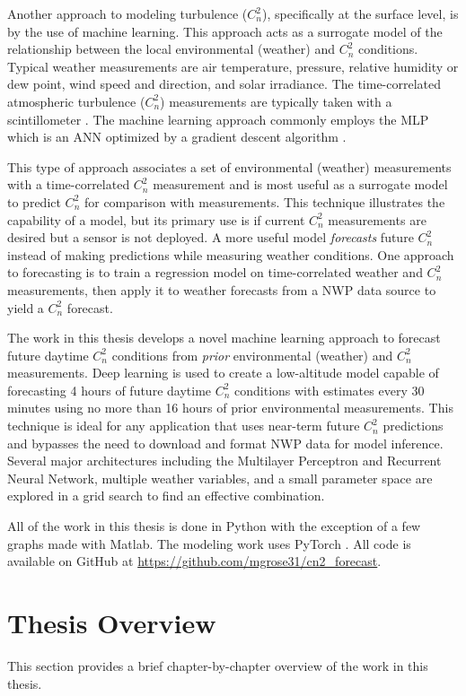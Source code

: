 Another approach to modeling turbulence ($C_{n}^{2}$), specifically at the surface level, is by the use of machine learning. This approach acts as a surrogate model of the relationship between the local environmental (weather) and $C_{n}^{2}$ conditions. Typical weather measurements are air temperature, pressure, relative humidity or dew point, wind speed and direction, and solar irradiance. The time-correlated atmospheric turbulence ($C_{n}^{2}$) measurements are typically taken with a scintillometer \cite{Jellen:20, Su:20, Wang:2014}. The machine learning approach commonly employs the \ac{MLP} which is an \ac{ANN} optimized by a gradient descent algorithm \cite{Su:20, Wang:2014}.

This type of approach associates a set of environmental (weather) measurements with a time-correlated $C_{n}^{2}$ measurement and is most useful as a surrogate model to predict $C_{n}^{2}$ for comparison with measurements. This technique illustrates the capability of a model, but its primary use is if current $C_{n}^{2}$ measurements are desired but a sensor is not deployed. A more useful model \emph{forecasts} future $C_{n}^{2}$ instead of making predictions while measuring weather conditions. One approach to forecasting is to train a regression model on time-correlated weather and $C_{n}^{2}$ measurements, then apply it to weather forecasts from a \ac{NWP} data source to yield a $C_{n}^{2}$ forecast.

The work in this thesis develops a novel machine learning approach to forecast future daytime $C_{n}^{2}$ conditions from \emph{prior} environmental (weather) and $C_{n}^{2}$ measurements. Deep learning is used to create a low-altitude model capable of forecasting 4 hours of future daytime $C_{n}^{2}$ conditions with estimates every 30 minutes using no more than 16 hours of prior environmental measurements. This technique is ideal for any application that uses near-term future $C_{n}^{2}$ predictions and bypasses the need to download and format \ac{NWP} data for model inference. Several major architectures including the Multilayer Perceptron and Recurrent Neural Network, multiple weather variables, and a small parameter space are explored in a grid search to find an effective combination.

All of the work in this thesis is done in Python with the exception of a few graphs made with Matlab. The modeling work uses PyTorch \cite{PyTorch}. All code is available on GitHub at \url{https://github.com/mgrose31/cn2_forecast}.

\section{Thesis Overview}
This section provides a brief chapter-by-chapter overview of the work in this thesis.

